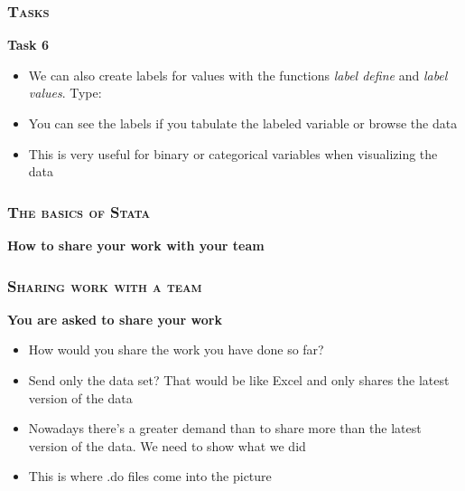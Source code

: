 \documentclass[10pt]{beamer}
\begin{document}
	\begin{frame}
		\frametitle{\textsc{Tasks}}
		\begin{center}	
			\Large\textbf{Task 6}
		\end{center}
		\begin{itemize}
			\item We can also create labels for values with the functions \textit{label define} and \textit{label values}. Type:
		\end{itemize}
\begin{stlog}\end{stlog}
	
		\begin{itemize}
			\item You can see the labels if you tabulate the labeled variable or browse the data
			\item This is very useful for binary or categorical variables when visualizing the data
		\end{itemize}		
	\end{frame}		
	
	
	\begin{frame}
		\frametitle{\textsc{The basics of Stata}}
		\begin{center}
			\textbf{How to share your work with your team}
		\end{center}
	\end{frame}

	\begin{frame}
		\frametitle{\textsc{Sharing work with a team}}
		\begin{center}
			\textbf{You are asked to share your work}
		\end{center}
		\begin{itemize}
			\item How would you share the work you have done so far?
			\item Send only the data set? That would be like Excel and only shares the latest version of the data
			\item Nowadays there's a greater demand than to share more than the latest version of the data. We need to show what we did
			\item This is where .do files come into the picture

		\end{itemize}
	\end{frame}
	
\end{document}
